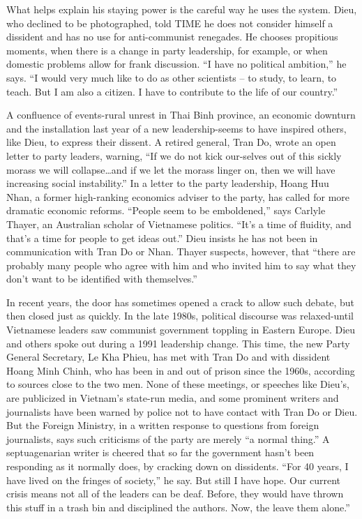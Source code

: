  What helps explain his staying power is the careful way he uses the system. Dieu, who declined to be photographed, told TIME he does not consider himself a dissident and has no use for anti-communist renegades. He chooses propitious moments, when there is a change in party leadership, for example, or when domestic problems allow for frank discussion. “I have no political ambition,” he says. “I would very much like to do as other scientists – to study, to learn, to teach. But I am also a citizen. I have to contribute to the life of our country.”
 
A confluence of events-rural unrest in Thai Binh province, an economic downturn and the installation last year of a new leadership-seems to have inspired others, like Dieu, to express their dissent. A retired general, Tran Do, wrote an open letter to party leaders, warning, “If we do not kick our-selves out of this sickly morass we will collapse…and if we let the morass linger on, then we will have increasing social instability.” In a letter to the party leadership, Hoang Huu Nhan, a former high-ranking economics adviser to the party, has called for more dramatic economic reforms. “People seem to be emboldened,” says Carlyle Thayer, an Australian scholar of Vietnamese politics. “It’s a time of fluidity, and that’s a time for people to get ideas out.” Dieu insists he has not been in communication with Tran Do or Nhan. Thayer suspects, however, that “there are probably many people who agree with him and who invited him to say what they don’t want to be identified with themselves.”

In recent years, the door has sometimes opened a crack to allow such debate, but then closed just as quickly. In the late 1980s, political discourse was relaxed-until Vietnamese leaders saw communist government toppling in Eastern Europe. Dieu and others spoke out during a 1991 leadership change. This time, the new Party General Secretary, Le Kha Phieu, has met with Tran Do and with dissident Hoang Minh Chinh, who has been in and out of prison since the 1960s, according to sources close to the two men. None of these meetings, or speeches like Dieu’s, are publicized in Vietnam’s state-run media, and some prominent writers and journalists have been warned by police not to have contact with Tran Do or Dieu. But the Foreign Ministry, in a written response to questions from foreign journalists, says such criticisms of the party are merely “a normal thing.” A septuagenarian writer is cheered that so far the government hasn’t been responding as it normally does, by cracking down on dissidents. “For 40 years, I have lived on the fringes of society,” he say. But still I have hope. Our current crisis means not all of the leaders can be deaf. Before, they would have thrown this stuff in a trash bin and disciplined the authors. Now, the leave them alone.”

